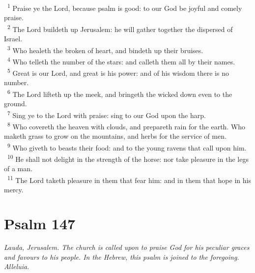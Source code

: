 \documentclass[a5paper,12pt]{article}
\begin{document}
\begin{multicols*}{2}
~\textsuperscript{1} Praise ye the Lord, because psalm is good: to our God be joyful and comely praise.\\
~\textsuperscript{2} The Lord buildeth up Jerusalem: he will gather together the dispersed of Israel.\\
~\textsuperscript{3} Who healeth the broken of heart, and bindeth up their bruises.\\
~\textsuperscript{4} Who telleth the number of the stars: and calleth them all by their names.\\
~\textsuperscript{5} Great is our Lord, and great is his power: and of his wisdom there is no number.\\
~\textsuperscript{6} The Lord lifteth up the meek, and bringeth the wicked down even to the ground.\\
~\textsuperscript{7} Sing ye to the Lord with praise: sing to our God upon the harp.\\
~\textsuperscript{8} Who covereth the heaven with clouds, and prepareth rain for the earth. Who maketh grass to grow on the mountains, and herbs for the service of men.\\
~\textsuperscript{9} Who giveth to beasts their food: and to the young ravens that call upon him.\\
~\textsuperscript{10} He shall not delight in the strength of the horse: nor take pleasure in the legs of a man.\\
~\textsuperscript{11} The Lord taketh pleasure in them that fear him: and in them that hope in his mercy.\\

\section{Psalm 147}
\label{sec:org3e6c368}
\emph{Lauda, Jerusalem. The church is called upon to praise God for his peculiar graces and favours to his people. In the Hebrew, this psalm is joined to the foregoing. Alleluia.}\\


\end{multicols*}
\end{document}
